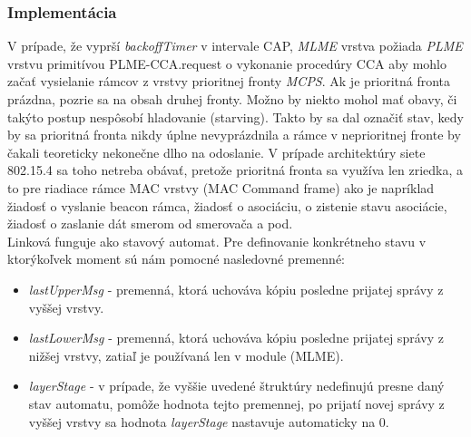 \subsubsection{Implementácia}
\indent\indent V prípade, že vyprší \textit{backoffTimer} v intervale CAP, \textit{MLME} vrstva požiada \textit{PLME} vrstvu primitívou PLME-CCA.request o vykonanie procedúry CCA aby mohlo začať vysielanie rámcov z vrstvy prioritnej fronty \textit{MCPS}. Ak je prioritná fronta prázdna, pozrie sa na obsah druhej fronty. Možno by niekto mohol mať obavy, či takýto postup nespôsobí hladovanie (starving). Takto by sa dal označiť stav, kedy by sa prioritná fronta nikdy úplne nevyprázdnila a rámce v neprioritnej fronte by čakali teoreticky nekonečne dlho na odoslanie. V prípade architektúry siete 802.15.4 sa toho netreba obávať, pretože prioritná fronta sa využíva len zriedka, a to pre riadiace rámce MAC vrstvy (MAC Command frame) ako je napríklad žiadosť o vyslanie beacon rámca, žiadosť o asociáciu, o zistenie stavu asociácie, žiadosť o zaslanie dát smerom od smerovača a pod.\\
\indent\indent Linková funguje ako stavový automat. Pre definovanie konkrétneho stavu v ktorýkoľvek moment sú nám pomocné nasledovné premenné:
\begin{itemize}
\item \textit{lastUpperMsg} - premenná, ktorá uchováva kópiu posledne prijatej správy z vyššej vrstvy.
\item \textit{lastLowerMsg} - premenná, ktorá uchováva kópiu posledne prijatej správy z nižšej vrstvy, zatiaľ je používaná len v module (MLME).
\item \textit{layerStage} - v prípade, že vyššie uvedené štruktúry nedefinujú presne daný stav automatu, pomôže hodnota tejto premennej, po prijatí novej správy z vyššej vrstvy sa hodnota \textit{layerStage} nastavuje automaticky na $0$.
\end{itemize}

